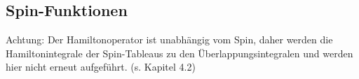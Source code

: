 \documentclass[fleqn]{article}%
\begin{document}
\subsection{Spin{-}Funktionen}%
\label{subsec:Spin{-}Funktionen}%
Achtung: Der Hamiltonoperator ist unabhängig vom Spin, daher werden die Hamiltonintegrale der Spin-Tableaus zu den Überlappungsintegralen und werden hier nicht erneut aufgeführt. (s. Kapitel 4.2) 

%
\newpage%
\tableofcontents%
\thispagestyle{fancy}%
\end{document}
